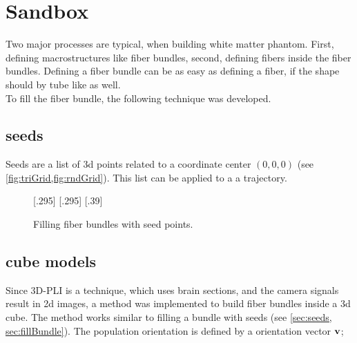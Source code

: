 % 
\section{Sandbox}
% 
Two major processes are typical, when building white matter phantom. First, defining macrostructures like fiber bundles, second, defining fibers inside the fiber bundles.
Defining a fiber bundle can be as easy as defining a fiber, if the shape should by tube like as well.
\\
To fill the fiber bundle, the following technique was developed.
% 
\subsection{seeds}\label{sec:seeds}
% 
Seeds are a list of 3d points related to a coordinate center $(0,0,0)$ (see \cref{fig:triGrid,fig:rndGrid}).
This list can be applied to a a trajectory.
% 
\begin{figure}[!t]
    \def\tikzheight{0.25\textwidth}
    \centering
    [.295\textwidth]{
    \hfill}
    [.295\textwidth]{
    \hfill}
    [.39\textwidth]{
    \hfill}
	\caption{Filling fiber bundles with seed points.}
\end{figure}
% 
\subsection{cube models}
% 
Since \ac{3D-PLI} is a technique, which uses brain sections, and the camera signals result in 2d images, a method was implemented to build fiber bundles inside a 3d cube.
The method works similar to filling a bundle with seeds (see \cref{sec:seeds, sec:fillBundle}).
The population orientation is defined by a orientation vector $\mathbf{v}$;
% 

